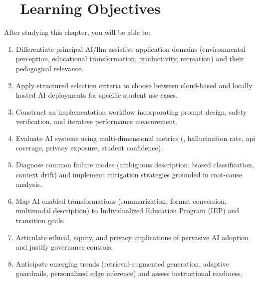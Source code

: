 \section{~~Learning Objectives}\label{ch9:sec:learning-objectives}
After studying this chapter, you will be able to:
\begin{enumerate}
	\item Differentiate principal AI/\gls{llm} assistive application domains (environmental perception, educational transformation, productivity, recreation) and their pedagogical relevance.\supercite{arxiv_visual_impairment, SeeingAI}
	\item Apply structured selection criteria to choose between cloud-based and locally hosted AI deployments for specific student use cases.\supercite{DataPrivacyAI, LlamaCpp}
	\item Construct an implementation workflow incorporating prompt design, safety verification, and iterative performance measurement.
	\item Evaluate AI systems using multi-dimensional metrics (, hallucination rate,  \gls{api} coverage, privacy exposure, student confidence).
	\item Diagnose common failure modes (ambiguous description, biased classification, context drift) and implement mitigation strategies grounded in root-cause analysis.\supercite{AI_Ethics_Bias, Bias_in_AI}
	\item Map AI-enabled transformations (summarization, format conversion, multimodal description) to Individualized Education Program (IEP) and transition goals.
	\item Articulate ethical, equity, and privacy implications of pervasive AI adoption and justify governance controls.\supercite{DataPrivacyAI}
	\item Anticipate emerging trends (retrieval-augmented generation, adaptive guardrails, personalized edge inference) and assess instructional readiness.
\end{enumerate}

